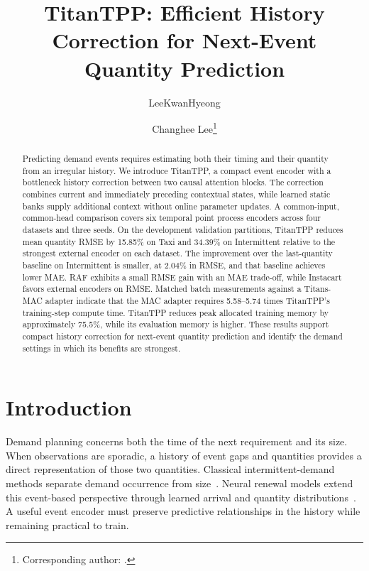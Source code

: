 \documentclass[runningheads]{llncs}
\begin{document}
\title{TitanTPP: Efficient History Correction for Next-Event Quantity Prediction}
\author{LeeKwanHyeong \and Changhee Lee\thanks{Corresponding author: .}}
\maketitle

\begin{abstract}
Predicting demand events requires estimating both their timing and their
quantity from an irregular history. We introduce TitanTPP, a compact event
encoder with a bottleneck history correction between two causal attention
blocks. The correction combines current and immediately preceding contextual
states, while learned static banks supply additional context without online
parameter updates. A common-input, common-head comparison covers six temporal
point process encoders across four datasets and three seeds. On the development
validation partitions, TitanTPP reduces mean quantity RMSE by 15.85\% on Taxi
and 34.39\% on Intermittent relative to the strongest external encoder on each
dataset. The improvement over the last-quantity baseline on Intermittent is
smaller, at 2.04\% in RMSE, and that baseline achieves lower MAE. RAF exhibits
a small RMSE gain with an MAE trade-off, while Instacart favors external
encoders on RMSE. Matched batch measurements against a Titans-MAC adapter
indicate that the MAC adapter requires 5.58--5.74 times TitanTPP's
training-step compute time. TitanTPP reduces peak allocated training memory by
approximately 75.5\%, while its evaluation memory is higher. These results support compact history correction for next-event
quantity prediction and identify the demand settings in which its benefits
are strongest.
\end{abstract}

\section{Introduction}
Demand planning concerns both the time of the next requirement and its size.
When observations are sporadic, a history of event gaps and quantities provides
a direct representation of those two quantities. Classical intermittent-demand
methods separate demand occurrence from size~\cite{croston1972forecasting}.
Neural renewal models extend this event-based perspective through learned
arrival and quantity distributions~\cite{turkmen2021renewal}. A useful event
encoder must preserve predictive relationships in the history while remaining
practical to train.
\end{document}
